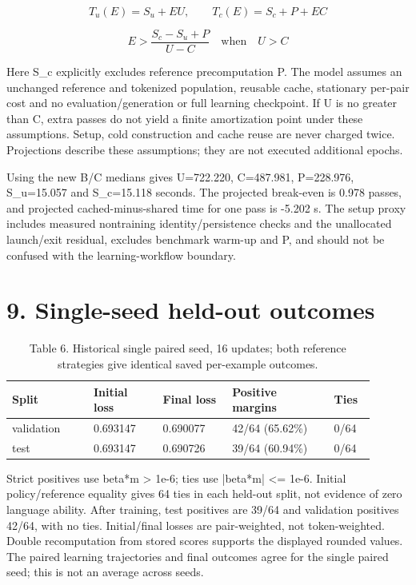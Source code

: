 \documentclass[10pt]{article}
\begin{document}
\[
T_u(E)=S_u+E U,\qquad T_c(E)=S_c+P+E C
\]

\[
E>\frac{S_c-S_u+P}{U-C}\quad\mathrm{when}\quad U>C
\]

Here S\_c explicitly excludes reference precomputation P. The model assumes an unchanged reference and tokenized population, reusable cache, stationary per-pair cost and no evaluation/generation or full learning checkpoint. If U is no greater than C, extra passes do not yield a finite amortization point under these assumptions. Setup, cold construction and cache reuse are never charged twice. Projections describe these assumptions; they are not executed additional epochs.


Using the new B/C medians gives U=722.220, C=487.981, P=228.976, S\_u=15.057 and S\_c=15.118 seconds. The projected break-even is 0.978 passes, and projected cached-minus-shared time for one pass is -5.202 s. The setup proxy includes measured nontraining identity/persistence checks and the unallocated launch/exit residual, excludes benchmark warm-up and P, and should not be confused with the learning-workflow boundary.


\section*{9. Single-seed held-out outcomes}

\begin{table}[htbp]\centering\footnotesize\caption{Table 6. Historical single paired seed, 16 updates; both reference strategies give identical saved per-example outcomes.}
\begin{tabular}{p{0.204\linewidth}p{0.170\linewidth}p{0.170\linewidth}p{0.255\linewidth}p{0.102\linewidth}}
\toprule
Split & Initial loss & Final loss & Positive margins & Ties \\ \midrule
validation & 0.693147 & 0.690077 & 42/64 (65.62\%) & 0/64 \\
test & 0.693147 & 0.690726 & 39/64 (60.94\%) & 0/64 \\
\bottomrule\end{tabular}\end{table}

Strict positives use beta*m > 1e-6; ties use |beta*m| <= 1e-6. Initial policy/reference equality gives 64 ties in each held-out split, not evidence of zero language ability. After training, test positives are 39/64 and validation positives 42/64, with no ties. Initial/final losses are pair-weighted, not token-weighted. Double recomputation from stored scores supports the displayed rounded values. The paired learning trajectories and final outcomes agree for the single paired seed; this is not an average across seeds.
\end{document}
